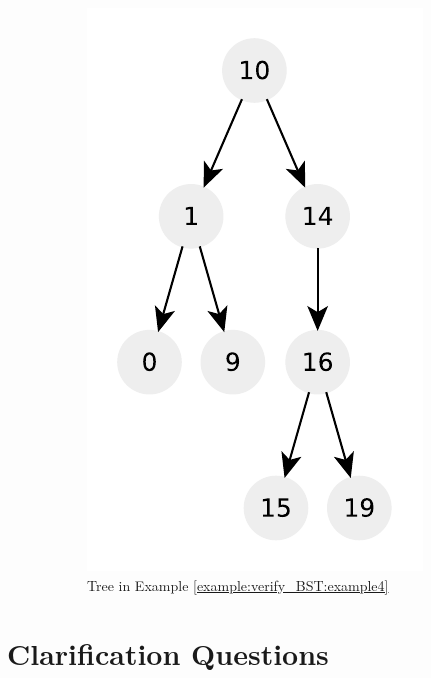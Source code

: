 \begin{figure}
\begin{subfigure}[t]{0.30\textwidth}
		 \includegraphics[width=1\linewidth]{sources/verify_BST/images/example4}
		 \caption[]{Tree in Example \ref{example:verify_BST:example4}}
		 \label{fig:verify:example4}
	  \end{subfigure}
	 \caption[]{}
	  \label{fig:verify:trees}
\end{figure}



\section{Clarification Questions}

